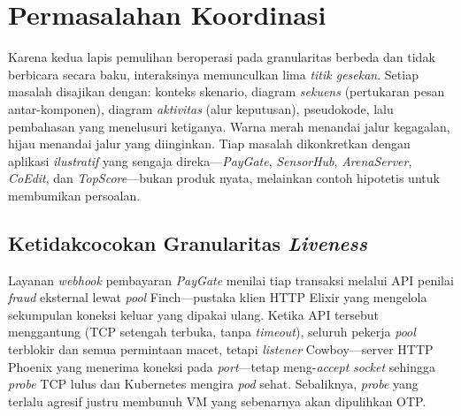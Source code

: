 \chapter{Permasalahan Koordinasi}
\label{ch:problems}

Karena kedua lapis pemulihan beroperasi pada granularitas berbeda dan tidak berbicara
secara baku, interaksinya memunculkan lima \emph{titik gesekan}. Setiap masalah disajikan
dengan: konteks skenario, diagram \emph{sekuens} (pertukaran pesan antar-komponen),
diagram \emph{aktivitas} (alur keputusan), pseudokode, lalu pembahasan yang menelusuri
ketiganya. Warna merah menandai jalur kegagalan, hijau menandai jalur yang diinginkan.
Tiap masalah dikonkretkan dengan aplikasi \emph{ilustratif} yang sengaja
direka---\emph{PayGate}, \emph{SensorHub}, \emph{ArenaServer}, \emph{CoEdit}, dan
\emph{TopScore}---bukan produk nyata, melainkan contoh hipotetis untuk membumikan
persoalan.

\section{Ketidakcocokan Granularitas \emph{Liveness}}
\label{sec:p1}
Layanan \emph{webhook} pembayaran \emph{PayGate} menilai tiap transaksi melalui API
penilai \emph{fraud} eksternal lewat \emph{pool} Finch---pustaka klien HTTP Elixir yang
mengelola sekumpulan koneksi keluar yang dipakai ulang. Ketika API tersebut menggantung
(TCP setengah terbuka, tanpa \emph{timeout}), seluruh pekerja \emph{pool} terblokir dan
semua permintaan macet, tetapi \emph{listener} Cowboy---server HTTP Phoenix yang menerima
koneksi pada \emph{port}---tetap meng-\emph{accept} \emph{socket} sehingga \emph{probe} TCP
lulus dan Kubernetes mengira \emph{pod} sehat. Sebaliknya, \emph{probe} yang terlalu agresif
justru membunuh VM yang sebenarnya akan dipulihkan OTP.

